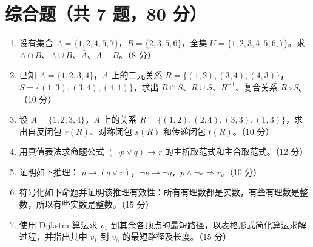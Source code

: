 \section{综合题（共 7 题，80 分）}

\begin{enumerate}
    \item 设有集合 $A=\{1,2,4,5,7\}$，$B=\{2,3,5,6\}$，全集 $U=\{1,2,3,4,5,6,7\}$。求 $A\cap B$、$A\cup B$、$\overline{A}$、$A-B$。（8 分）

    \vspace{3cm}

    \item 已知 $A=\{1,2,3,4\}$，$A$ 上的二元关系
    $R=\{(1,2),(3,4),(4,3)\}$，
    $S=\{(1,3),(3,4),(4,1)\}$，求出 $R\cap S$、$R\cup S$、$R^{-1}$、复合关系 $R\circ S$。（10 分）

    \vspace{3cm}

    \item 设 $A=\{1,2,3,4\}$，$A$ 上的关系
    $R=\{(1,2),(2,4),(3,3),(1,3)\}$，求出自反闭包 $r(R)$、对称闭包 $s(R)$ 和传递闭包 $t(R)$。（10 分）

    \vspace{3cm}

    \item 用真值表法求命题公式 $(\neg p\lor q)\to r$ 的主析取范式和主合取范式。（12 分）

    \vspace{3cm}

    \item 证明如下推理：
    $p\to(q\lor r)$，$\neg s\to \neg q$，$p\land \neg s\Rightarrow r$。（10 分）

    \vspace{3cm}

    \item 符号化如下命题并证明该推理有效性：所有有理数都是实数，有些有理数是整数，所以有些实数是整数。（15 分）

    \vspace{3cm}

    \item 使用 Dijkstra 算法求 $v_1$ 到其余各顶点的最短路径，以表格形式简化算法求解过程，并指出其中 $v_1$ 到 $v_6$ 的最短路径及长度。（15 分）

    \begin{center}
\end{center}
\end{enumerate}
